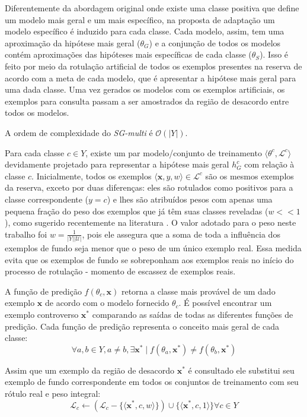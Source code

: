 Diferentemente da abordagem original onde existe uma classe positiva
que define um modelo mais geral e um mais específico,
na proposta de adaptação um modelo específico é induzido para cada classe.
Cada modelo, assim, tem uma aproximação da hipótese mais geral
($\theta_G$) e a conjunção de todos os modelos contém
aproximações das hipóteses mais específicas de cada classe ($\theta_S$).
Isso é feito por meio da rotulação artificial de todos os exemplos presentes
na reserva de acordo com a meta de cada modelo,
que é apresentar a hipótese mais geral para uma dada classe.
Uma vez gerados os modelos com os exemplos artificiais,
os exemplos para consulta passam a ser amostrados da região de desacordo
entre todos os modelos.

A ordem de complexidade do \textit{SG-multi} é $\mathcal{O}(|Y|)$.


Para cada classe $c \in Y$, existe um par modelo/conjunto de treinamento
$\langle\theta^c,\mathcal{L}^c\rangle$
devidamente projetado para representar a hipótese mais geral
$h^c_G$ com relação à classe $c$.
Inicialmente, todos os exemplos
$\langle\bm{x},y,w\rangle \in \mathcal{L}^c$
são os mesmos exemplos da reserva, exceto por duas diferenças:
eles são rotulados como positivos para a classe correspondente
($y=c$) e lhes são atribuídos pesos com apenas uma pequena fração
do peso dos exemplos que já têm suas classes reveladas
($w << 1$),
como sugerido recentemente na literatura \cite{series/synthesis/2012Settles}.
O valor adotado para o peso neste trabalho foi
$w=\frac{1}{|Y||\mathcal{U}|}$,
pois ele assegura que a soma de toda a influência dos exemplos de fundo
seja menor que o peso de um único exemplo real.
Essa medida evita que os exemplos de fundo se sobreponham aos
exemplos reais no início do processo de rotulação - momento de escassez
de exemplos reais.

A função de predição $f(\theta_c, \bm{x})$ retorna
a classe mais provável de um dado exemplo $\bm{x}$
de acordo com o modelo fornecido $\theta_c$.
É possível encontrar um exemplo controverso $\bm{x}^*$ 
comparando as saídas de todas as diferentes funções de predição.
Cada função de predição representa o conceito mais geral
de cada classe:
\[
  \forall a,b \in Y, a \neq b, \exists \bm{x}^* \mid f(\theta_a,\bm{x}^*) \neq f(\theta_b,\bm{x}^*)
\]

Assim que um exemplo da região de desacordo $\bm{x}^*$ é consultado
ele substitui seu exemplo de fundo correspondente em todos os conjuntos
de treinamento com seu rótulo real e peso integral:
 \[
  \mathcal{L}_c \leftarrow (\mathcal{L}_c - \{\langle\bm{x}^*,c,w\rangle\}) \cup
\{\langle\bm{x}^*,c,1\rangle\} \forall c \in Y
 \]


